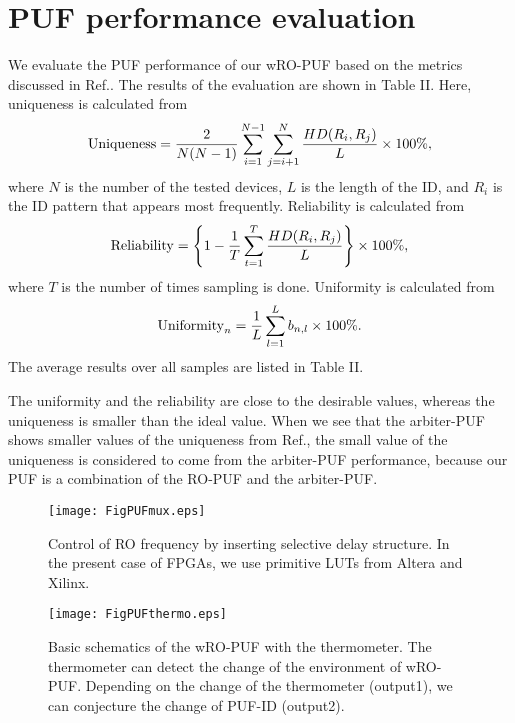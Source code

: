﻿\documentclass[aps,preprint,prb,superscriptaddress,amsmath,showpacs,tightenlines]{revtex4}
\begin{document}
\section{PUF performance evaluation}
We evaluate the PUF performance of our wRO-PUF based 
on the metrics discussed in Ref.\cite{Maiti3,Hori}.
The results of the evaluation are shown in Table II.
Here, uniqueness is calculated from
\begin{equation}
{\rm Uniqueness}=\frac{2}{N(N-1)}\sum_{i=1}^{N-1}\sum_{j=i+1}^N
\frac{HD(R_i,R_j)}{L}\times 100\%,
\end{equation}
where $N$ is the number of the tested devices, $L$ is  
the length of the ID, and $R_i$ is the ID pattern that appears most frequently.
Reliability is calculated from
\begin{equation}
{\rm Reliability}= \left\{1-\frac{1}{T}\sum_{t=1}^{T}\frac{HD(R_i,R_j)}{L} \right\}\times 100\%,
\end{equation}
where $T$ is the number of times sampling is done.
Uniformity is calculated from 
\begin{equation}
{\rm Uniformity}_n=\frac{1}{L}\sum_{l=1}^{L} b_{n,l} \times 100 \%.
\end{equation}
The average results over all samples are listed in Table II.

The uniformity and the reliability are close to the desirable values, 
whereas the uniqueness is smaller than the ideal value.
When we see that the arbiter-PUF shows smaller values of the uniqueness 
from Ref.\cite{Maiti3,Hori}, 
the small value of the uniqueness is considered to
come from the arbiter-PUF performance, 
because our PUF is a combination of the RO-PUF and the arbiter-PUF.



\begin{figure}
\centering
\texttt{[image: FigPUFmux.eps]}
\caption{
Control of RO frequency by inserting selective 
delay structure. In the present case of FPGAs,
we use primitive LUTs from Altera and Xilinx.
} 
\label{mux}
\end{figure}

\begin{figure}
\centering
\texttt{[image: FigPUFthermo.eps]}
\caption{
Basic schematics of the wRO-PUF with the thermometer.
The thermometer can detect the change of the environment of wRO-PUF.
Depending on the change of the thermometer (output1), 
we can conjecture the change of PUF-ID (output2).} 
\label{system}
\end{figure}
\end{document}

